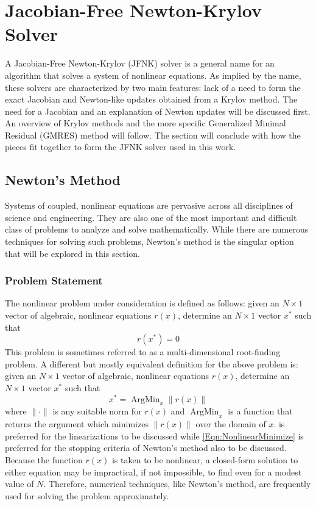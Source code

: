 \documentclass[Prelim,12pt]{WisconsinThesis}
\newcommand{\by}    {\!\times\!}
\DeclareMathOperator*{\ArgMin}{ArgMin}
\begin{document}
\chapter[JFNK Solver]{Jacobian-Free Newton-Krylov Solver}

A Jacobian-Free Newton-Krylov (JFNK) solver is a general name for an algorithm that solves a system of nonlinear equations.
As implied by the name, these solvers are characterized by two main features: lack of a need to form the exact Jacobian and Newton-like updates obtained from a Krylov method.
The need for a Jacobian and an explanation of Newton updates will be discussed first.
An overview of Krylov methods and the more specific Generalized Minimal Residual (GMRES) method will follow.
The section will conclude with how the pieces fit together to form the JFNK solver used in this work.





\section{Newton's Method}
Systems of coupled, nonlinear equations are pervasive across all disciplines of science and engineering.
They are also one of the most important and difficult class of problems to analyze and solve mathematically.
While there are numerous techniques for solving such problems, Newton's method is the singular option that will be explored in this section.

\subsection{Problem Statement}
The nonlinear problem under consideration is defined as follows: given an $N \by 1$ vector of algebraic, nonlinear equations $r(x)$, determine an $N \by 1$ vector $x^*$ such that
\begin{equation}
    r(x^*) = 0
    \label{Eqn:NonlinearRootFind}
\end{equation}
This problem is sometimes referred to as a multi-dimensional root-finding problem.
A different but mostly equivalent definition for the above problem is: given an $N \by 1$ vector of algebraic, nonlinear equations $r(x)$, determine an $N \by 1$ vector $x^*$ such that
\begin{equation}
    x^* = \ArgMin_{x} \|r(x)\|
    \label{Eqn:NonlinearMinimize}
\end{equation}
where $\|\cdot\|$ is any suitable norm for $r(x)$ and $\ArgMin_x$ is a function that returns the argument which minimizes $\|r(x)\|$ over the domain of $x$.
 is preferred for the linearizations to be discussed while \cref{Eqn:NonlinearMinimize} is preferred for the stopping criteria of Newton's method also to be discussed.
Because the function $r(x)$ is taken to be nonlinear, a closed-form solution to either equation may be impractical, if not impossible, to find even for a modest value of $N$.
Therefore, numerical techniques, like Newton's method, are frequently used for solving the problem approximately.
\end{document}

